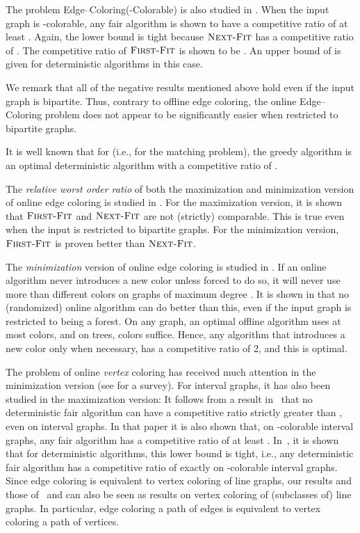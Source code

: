 \documentclass[smallextended]{svjour3}
\def\mck{{\sc Edge--Coloring}\xspace}
\def\mckcol{{\sc Edge--Coloring(-Colorable)}\xspace}
\newcommand{\NF}{\ensuremath{\operatorname{\textsc{Next-Fit}}}\xspace}
\newcommand{\FF}{\ensuremath{\operatorname{\textsc{First-Fit}}}\xspace}
\begin{document}
The problem \mckcol is also studied in \cite{kedge}. When the input graph is -colorable, any fair algorithm is shown to have a competitive ratio of at least . Again, the lower bound is tight because \NF has a competitive ratio of . The competitive ratio of \FF is shown to be . An upper bound of  is given for deterministic algorithms in this case. 

We remark that all of the negative results mentioned above hold even if the input graph is bipartite. Thus, contrary to offline edge coloring, the online \mck problem does not appear to be significantly easier when restricted to bipartite graphs.

It is well known that for  (i.e., for the matching problem), the greedy algorithm is an optimal deterministic algorithm with a competitive ratio of .

The {\em relative worst order ratio} \cite{WRdefinition,boyar2007relative} of both the maximization and minimization version of online edge coloring is studied in \cite{kedge2}. For the maximization version, it is shown that \FF and \NF are not (strictly) comparable. This is true even when the input is restricted to bipartite graphs. For the minimization version, \FF is proven better than \NF.

The {\em minimization} version of online edge coloring is studied in
\cite{Bar-Noy}. If an online algorithm never introduces a new color
unless forced to do so, it will never use more than 
different colors on graphs of maximum degree . It is shown in
\cite{Bar-Noy} that no (randomized) online algorithm can do better than this, even
if the input graph is restricted to being a forest.
On any graph, an optimal offline algorithm uses at most 
 colors, and on trees,  colors suffice.
Hence, any algorithm that introduces a new color only when necessary,
 has a competitive ratio of 2, and this is optimal.

 The problem of online {\em vertex} coloring has received much attention in
the minimization version (see 
\cite{kierstead1998coloring} for a survey). 
For interval graphs, it has also been studied in the maximization version:
It follows from a result in~\cite{seatres} that
no deterministic fair algorithm can have a competitive ratio strictly
greater than , even on interval graphs.
In that paper it is also shown that, on -colorable interval graphs,
any fair algorithm has a competitive ratio of at least
. 
In~\cite{seatresTight}, it is shown that for deterministic algorithms,
this lower bound is tight, i.e., any deterministic fair algorithm has
a competitive ratio of exactly  on -colorable interval
graphs.
Since edge coloring is equivalent to vertex coloring of line graphs,
our results and those of~\cite{kedge} and \cite{kedge2} can also
be seen as results on vertex coloring of (subclasses of) line graphs.
In particular, edge coloring a path of
 edges is equivalent to vertex coloring a
path of  vertices.
\end{document}
